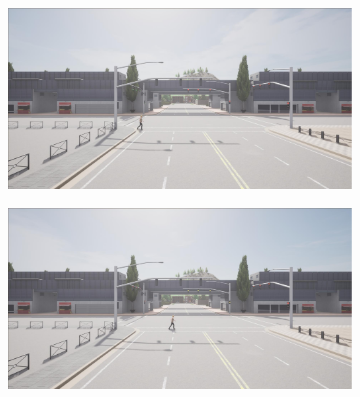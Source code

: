 \begin{figure}[H]
    \begin{minipage}{\textwidth}
        \centering
        \begin{subfigure}{0.48\textwidth}
            \includegraphics[width=\textwidth]{images/crossing_walking5.pdf}
        \end{subfigure}
        \begin{subfigure}{0.48\textwidth}
            \includegraphics[width=\textwidth]{images/crossing_walking6.pdf}
        \end{subfigure}

        \vspace{0.3cm}


\end{minipage}
\end{figure}
